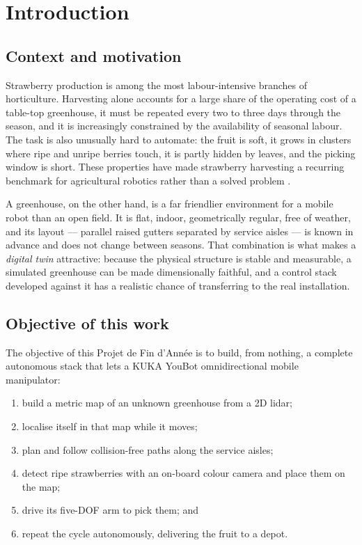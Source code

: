 \section{Introduction}

\subsection{Context and motivation}

Strawberry production is among the most labour-intensive branches of
horticulture. Harvesting alone accounts for a large share of the
operating cost of a table-top greenhouse, it must be repeated every two
to three days through the season, and it is increasingly constrained by
the availability of seasonal labour. The task is also unusually hard to
automate: the fruit is soft, it grows in clusters where ripe and unripe
berries touch, it is partly hidden by leaves, and the picking window is
short. These properties have made strawberry harvesting a recurring
benchmark for agricultural robotics rather than a solved problem
\cite{bac2014harvesting,vanhenten2002cucumber}.

A greenhouse, on the other hand, is a far friendlier environment for a
mobile robot than an open field. It is flat, indoor, geometrically
regular, free of weather, and its layout --- parallel raised gutters
separated by service aisles --- is known in advance and does not change
between seasons. That combination is what makes a \emph{digital twin}
attractive: because the physical structure is stable and measurable, a
simulated greenhouse can be made dimensionally faithful, and a control
stack developed against it has a realistic chance of transferring to the
real installation.

\subsection{Objective of this work}

The objective of this Projet de Fin d'Ann\'ee is to build, from nothing,
a complete autonomous stack that lets a KUKA YouBot omnidirectional
mobile manipulator:

\begin{enumerate}[leftmargin=*,itemsep=1pt,topsep=2pt]
  \item build a metric map of an unknown greenhouse from a 2D lidar;
  \item localise itself in that map while it moves;
  \item plan and follow collision-free paths along the service aisles;
  \item detect ripe strawberries with an on-board colour camera and
        place them on the map;
  \item drive its five-DOF arm to pick them; and
  \item repeat the cycle autonomously, delivering the fruit to a depot.
\end{enumerate}

